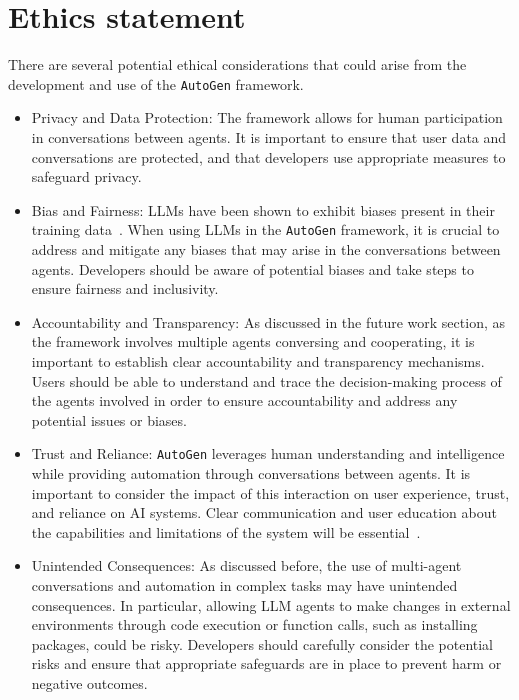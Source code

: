 \documentclass{article} %
\newcommand{\libName}{\texttt{AutoGen}\xspace}
\renewcommand{\cite}{\citep}
\begin{document}
\section*{Ethics statement}
 \label{append:ethical}
There are several potential ethical considerations that could arise from the development and use of the \libName framework.
\begin{itemize}[leftmargin=*]
    \vspace{-1mm}
    \setlength\itemsep{-0.1em}
    \item Privacy and Data Protection: The framework allows for human participation in conversations between agents. It is important to ensure that user data and conversations are protected, and that developers use appropriate measures to safeguard privacy.

\item Bias and Fairness: LLMs have been shown to exhibit biases present in their training data~\cite{navigli2023biases}. When using LLMs in the \libName framework, it is crucial to address and mitigate any biases that may arise in the conversations between agents. Developers should be aware of potential biases and take steps to ensure fairness and inclusivity.

\item Accountability and Transparency: As discussed in the future work section, as the framework involves multiple agents conversing and cooperating, it is important to establish clear accountability and transparency mechanisms. Users should be able to understand and trace the decision-making process of the agents involved in order to ensure accountability and address any potential issues or biases.

\item Trust and Reliance: \libName leverages human understanding and intelligence while providing automation through conversations between agents. It is important to consider the impact of this interaction on user experience, trust, and reliance on AI systems. Clear communication and user education about the capabilities and limitations of the system will be essential~\cite{Cai2019HelloAU}.

\item Unintended Consequences: As discussed before, the use of multi-agent conversations and automation in complex tasks may have unintended consequences. In particular, allowing LLM agents to make changes in external environments through code execution or function calls, such as installing packages, could be risky. Developers should carefully consider the potential risks and ensure that appropriate safeguards are in place to prevent harm or negative outcomes.

\end{itemize}
\end{document}
